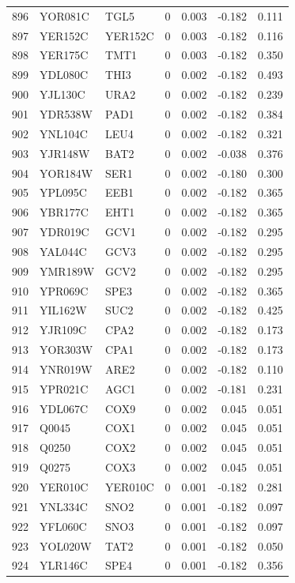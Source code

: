 \begin{longtable}{rllrrrr}
896 & YOR081C & TGL5 & 0 & 0.003 & -0.182 & 0.111\\
897 & YER152C & YER152C & 0 & 0.003 & -0.182 & 0.116\\
898 & YER175C & TMT1 & 0 & 0.003 & -0.182 & 0.350\\
899 & YDL080C & THI3 & 0 & 0.002 & -0.182 & 0.493\\
900 & YJL130C & URA2 & 0 & 0.002 & -0.182 & 0.239\\
901 & YDR538W & PAD1 & 0 & 0.002 & -0.182 & 0.384\\
902 & YNL104C & LEU4 & 0 & 0.002 & -0.182 & 0.321\\
903 & YJR148W & BAT2 & 0 & 0.002 & -0.038 & 0.376\\
904 & YOR184W & SER1 & 0 & 0.002 & -0.180 & 0.300\\
905 & YPL095C & EEB1 & 0 & 0.002 & -0.182 & 0.365\\
906 & YBR177C & EHT1 & 0 & 0.002 & -0.182 & 0.365\\
907 & YDR019C & GCV1 & 0 & 0.002 & -0.182 & 0.295\\
908 & YAL044C & GCV3 & 0 & 0.002 & -0.182 & 0.295\\
909 & YMR189W & GCV2 & 0 & 0.002 & -0.182 & 0.295\\
910 & YPR069C & SPE3 & 0 & 0.002 & -0.182 & 0.365\\
911 & YIL162W & SUC2 & 0 & 0.002 & -0.182 & 0.425\\
912 & YJR109C & CPA2 & 0 & 0.002 & -0.182 & 0.173\\
913 & YOR303W & CPA1 & 0 & 0.002 & -0.182 & 0.173\\
914 & YNR019W & ARE2 & 0 & 0.002 & -0.182 & 0.110\\
915 & YPR021C & AGC1 & 0 & 0.002 & -0.181 & 0.231\\
916 & YDL067C & COX9 & 0 & 0.002 & 0.045 & 0.051\\
917 & Q0045 & COX1 & 0 & 0.002 & 0.045 & 0.051\\
918 & Q0250 & COX2 & 0 & 0.002 & 0.045 & 0.051\\
919 & Q0275 & COX3 & 0 & 0.002 & 0.045 & 0.051\\
920 & YER010C & YER010C & 0 & 0.001 & -0.182 & 0.281\\
921 & YNL334C & SNO2 & 0 & 0.001 & -0.182 & 0.097\\
922 & YFL060C & SNO3 & 0 & 0.001 & -0.182 & 0.097\\
923 & YOL020W & TAT2 & 0 & 0.001 & -0.182 & 0.050\\
924 & YLR146C & SPE4 & 0 & 0.001 & -0.182 & 0.356\\

\end{longtable}
